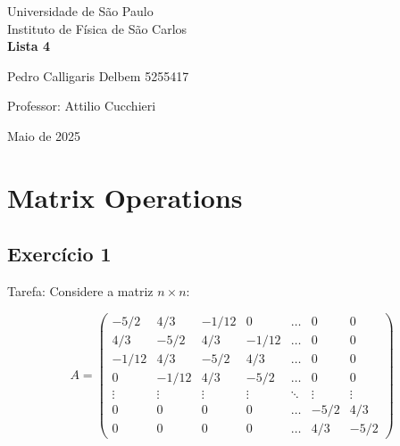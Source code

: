 \documentclass[12pt, a4paper]{article} %
\begin{document}
	
	\begin{titlepage}
		\begin{center}
\Huge{Universidade de São Paulo}\\
\large{Instituto de Física de São Carlos}\\
\vspace{20pt}
\vspace{200pt}
\textbf{Lista 4}\\
\vspace{8cm}
		\end{center}

\begin{flushleft}
\begin{tabbing}
Pedro Calligaris Delbem 5255417\\
\end{tabbing}
\vspace{0.5cm}
Professor: Attilio Cucchieri\\		
		\end{flushleft}
	
		\begin{center}
			\vspace{\fill}
	Maio de 2025	
		\end{center}
	\end{titlepage}

	\tableofcontents 
	\thispagestyle{empty}
	\newpage

\section{Matrix Operations}

    \subsection{Exerc\'icio 1}

        Tarefa: Considere a matriz $n \times n$:

        $$
        A = 
        \begin{pmatrix}
        -5/2 & 4/3 & -1/12 & 0 & \dots & 0 & 0 \\
        4/3 & -5/2 & 4/3 & -1/12 & \dots & 0 & 0 \\
        -1/12 & 4/3 & -5/2 & 4/3 & \dots & 0 & 0 \\
        0 & -1/12 & 4/3 & -5/2 & \dots & 0 & 0 \\
        \vdots & \vdots & \vdots & \vdots & \ddots & \vdots & \vdots \\
        0 & 0 & 0 & 0 & \dots & -5/2 & 4/3 \\
        0 & 0 & 0 & 0 & \dots & 4/3 & -5/2 
        \end{pmatrix}
        $$
        
\end{document}
